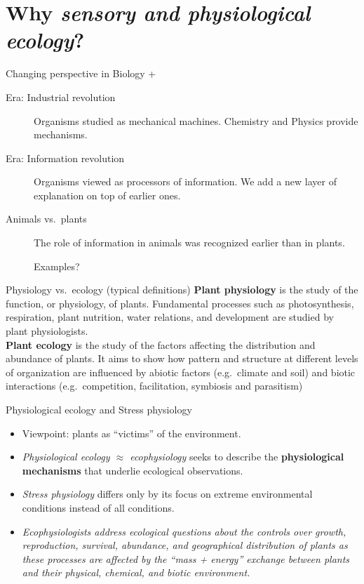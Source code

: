 \documentclass[10pt]{beamer}
\begin{document}
\section{Why \emph{sensory and physiological ecology}?}
\nocite{Dusenbery1992,Taiz2014}
\begin{frame}{Changing perspective in Biology + \Discussion}
  \begin{description}
    \item[Era: Industrial revolution] Organisms studied as mechanical machines. Chemistry and Physics provide mechanisms.
    \item[Era: Information revolution] Organisms viewed as processors of information. We add a new layer of explanation on top of earlier ones.
    \item[Animals vs.\ plants] The role of information in animals was recognized earlier than in plants.
    \item[\DiscussionI] Examples?
  \end{description}
\end{frame}

\begin{frame}{Physiology vs.\ ecology (typical definitions)}
    \textbf{Plant physiology} is the study of the function,
    or physiology, of plants. Fundamental processes such as
    photosynthesis, respiration, plant nutrition, water
    relations, and development are studied by plant physiologists.\\[2ex]

    \textbf{Plant ecology} is the study of the factors affecting the distribution and abundance
    of plants. It aims to show how pattern and structure at
    different levels of organization are influenced by abiotic
    factors (e.g.\ climate and soil) and biotic interactions
    (e.g.\ competition, facilitation, symbiosis and parasitism)
    \\  
\end{frame}

\begin{frame}{Physiological ecology and Stress physiology}
    \nocite{Lambers2008,Lambers2019}
    \begin{itemize}
        \item Viewpoint: plants as ``victims'' of the environment.
        \item \emph{Physiological ecology $\approx$ ecophysiology} seeks to describe the
        \textbf{physiological mechanisms} that underlie ecological
        observations.
        \item \emph{Stress physiology} differs only by its focus on extreme environmental conditions instead of all conditions.
        \item \emph{Ecophysiologists address ecological questions about
        the controls over growth, reproduction, survival, abundance,
        and geographical distribution of plants as these processes
        are affected by the ``mass + energy'' exchange between plants and their physical, chemical, and biotic environment.}
    \end{itemize}
\end{frame}
\end{document}
